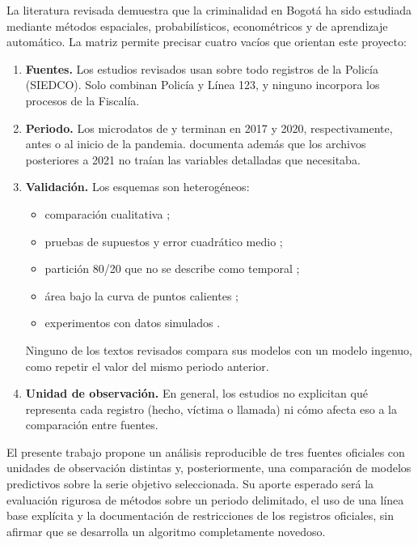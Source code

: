 La literatura revisada demuestra que la criminalidad en Bogotá ha sido estudiada mediante métodos espaciales, probabilísticos, econométricos y de aprendizaje automático. La matriz permite precisar cuatro vacíos que orientan este proyecto:
\begin{enumerate}
  \item \textbf{Fuentes.} Los estudios revisados usan sobre todo registros de la Policía (SIEDCO). Solo \citet{riascos2023} combinan Policía y Línea 123, y ninguno incorpora los procesos de la Fiscalía.
  \item \textbf{Periodo.} Los microdatos de \citet{campo2017} y \citet{martinez2025} terminan en 2017 y 2020, respectivamente, antes o al inicio de la pandemia. \citet{martinez2025} documenta además que los archivos posteriores a 2021 no traían las variables detalladas que necesitaba.
  \item \textbf{Validación.} Los esquemas son heterogéneos:
  \begin{itemize}
    \item comparación cualitativa \citep{campo2017};
    \item pruebas de supuestos y error cuadrático medio \citep{garzon2025};
    \item partición 80/20 que no se describe como temporal \citep{martinez2025};
    \item área bajo la curva de puntos calientes \citep{urcuqui2020};
    \item experimentos con datos simulados \citep{riascos2023}.
  \end{itemize}
  Ninguno de los textos revisados compara sus modelos con un modelo ingenuo, como repetir el valor del mismo periodo anterior.
  \item \textbf{Unidad de observación.} En general, los estudios no explicitan qué representa cada registro (hecho, víctima o llamada) ni cómo afecta eso a la comparación entre fuentes.
\end{enumerate}

El presente trabajo propone un análisis reproducible de tres fuentes oficiales con unidades de observación distintas y, posteriormente, una comparación de modelos predictivos sobre la serie objetivo seleccionada. Su aporte esperado será la evaluación rigurosa de métodos sobre un periodo delimitado, el uso de una línea base explícita y la documentación de restricciones de los registros oficiales, sin afirmar que se desarrolla un algoritmo completamente novedoso.
